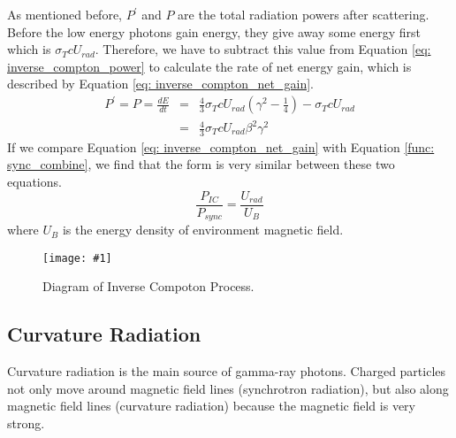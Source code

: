 \documentclass[12pt]{report}
\newcommand{\singleFig}[3]{
  \begin{figure}[!htp]
    \centering
    \texttt{[image: \#1]}
    \caption{#3}
    \label{fig: #1}
  \end{figure}
}
\begin{document}
      As mentioned before, $P^{\prime}$ and $P$ are the total radiation powers after 
      scattering. Before the low energy photons gain energy, they give away some energy 
      first which is $\sigma_{T} c U_{rad}$. 
      Therefore, we have to subtract this value from Equation \ref{eq: inverse_compton_power} 
      to calculate the rate of net energy gain, which is described by Equation 
      \ref{eq: inverse_compton_net_gain}.
      \begin{eqnarray}
        \label{eq: inverse_compton_net_gain}
        P^{\prime} = P = \frac{dE}{dt} &=& \frac{4}{3} \sigma_{T} c U_{rad} \left(\gamma^2 - \frac{1}{4}\right) - \sigma_{T} c U_{rad} \nonumber \\
                                          &=& \frac{4}{3} \sigma_{T} c U_{rad} \beta^{2} \gamma^{2}
      \end{eqnarray}
      If we compare Equation \ref{eq: inverse_compton_net_gain} with 
      Equation \ref{func: sync_combine}, we find that the form is very similar between these 
      two equations. 
      \begin{equation}
        \label{eq: comparision_inverse_compton_and_sync}
        \frac{P_{IC}}{P_{sync}} = \frac{U_{rad}}{U_{B}}
      \end{equation}
      where $U_{B}$ is the energy density of environment magnetic field. 

      \vspace{1cm}
      \singleFig{inverse_compton_time_interval}{0.45}{Diagram of Inverse Compoton Process.}
    
    \subsection{Curvature Radiation}
      Curvature radiation is the main source of gamma-ray photons. Charged particles  
      not only move around magnetic field lines (synchrotron radiation), 
      but also along magnetic field lines (curvature radiation) because the magnetic 
      field is very strong.
\end{document}
